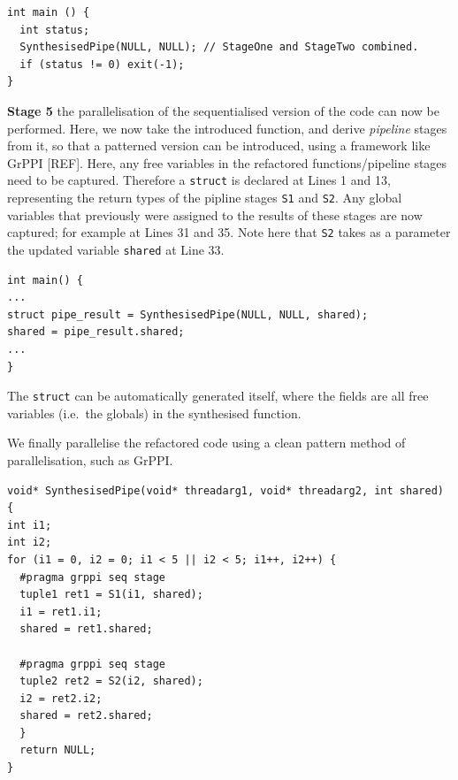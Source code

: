   \begin{lstlisting}[frame=single]
int main () {
  int status;
  SynthesisedPipe(NULL, NULL); // StageOne and StageTwo combined.
  if (status != 0) exit(-1);
}
\end{lstlisting}


\textbf{Stage 5} the parallelisation of the sequentialised version of the code can now be performed. Here, we now take the introduced function, and derive \emph{pipeline} stages from it, so that a patterned version can be introduced, using a framework like GrPPI [REF]. Here, any free variables in the refactored functions/pipeline stages need to be captured. Therefore a \lstinline|struct| is declared at Lines 1 and 13, representing the return types of the pipline stages \lstinline|S1| and \lstinline|S2|. Any global variables that previously were assigned to the results of these stages are now captured; for example at Lines 31 and 35. Note here that \lstinline{S2} takes as a parameter the updated variable \lstinline{shared} at Line 33. 

\begin{lstlisting}[frame=single]
int main() {
...
struct pipe_result = SynthesisedPipe(NULL, NULL, shared);
shared = pipe_result.shared;
...
}
\end{lstlisting}
The \lstinline|struct| can be automatically generated itself, where the fields are all free variables (i.e.\ the globals) in the synthesised function.

We finally parallelise the refactored code using a clean pattern method of parallelisation, such as GrPPI.

\begin{lstlisting}[frame=single]
void* SynthesisedPipe(void* threadarg1, void* threadarg2, int shared) {
int i1;
int i2;
for (i1 = 0, i2 = 0; i1 < 5 || i2 < 5; i1++, i2++) {
  #pragma grppi seq stage
  tuple1 ret1 = S1(i1, shared);
  i1 = ret1.i1;
  shared = ret1.shared;

  #pragma grppi seq stage
  tuple2 ret2 = S2(i2, shared);
  i2 = ret2.i2;
  shared = ret2.shared;
  }
  return NULL;
}
\end{lstlisting}

